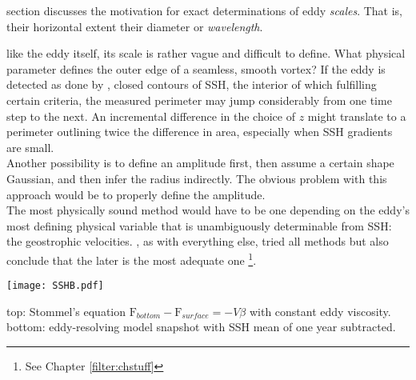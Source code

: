  section discusses the motivation for exact determinations of eddy \textit{scales}. That is, their horizontal extent \ie their diameter or \textit{wavelength}.

 like the eddy itself, its scale is rather vague and difficult to define. What physical parameter defines the outer edge of a seamless, smooth vortex? If the eddy is detected as done by \citet{Chelton2011}, \ie closed contours of SSH, the interior of which fulfilling certain criteria, the measured perimeter may jump considerably from one time step to the next. An incremental difference in the choice of $z$ might translate to a perimeter outlining twice the  difference in area, especially when SSH gradients are small.\\
Another possibility is to define an amplitude first, then assume a certain shape \eg Gaussian, and then infer the radius indirectly. The obvious problem with this approach would be to properly define the amplitude.\\
The most physically sound method would have to be one depending on the eddy's most defining physical variable that is unambiguously determinable from SSH: the geostrophic velocities. \citet{Chelton2011}, as with everything else, tried all methods but also conclude that the later is the most adequate one \footnote{See Chapter \cref{filter:chstuff}}.

%
\begin{marginfigure}
\texttt{[image: SSHB.pdf]}
  \caption{top: Stommel's equation $\mathrm{F}_{bottom}-\mathrm{F}_{surface}= -V\beta$ with constant eddy viscosity. bottom: \POP eddy-resolving model snapshot with SSH mean of one year subtracted. }
  \label{fig:SSHB}
\end{marginfigure}



